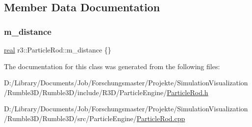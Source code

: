 \subsection{Member Data Documentation}
\mbox{\label{classr3_1_1_particle_rod_af5a502fa94afea7144eadd509a951f70}} 
\subsubsection{\texorpdfstring{m\+\_\+distance}{m\_distance}}
{\footnotesize\ttfamily \mbox{\hyperlink{namespacer3_ab2016b3e3f743fb735afce242f0dc1eb}{real}} r3\+::\+Particle\+Rod\+::m\+\_\+distance \{\}\hspace{0.3cm}{\ttfamily [protected]}}



The documentation for this class was generated from the following files\+:\begin{DoxyCompactItemize}
\item 
D\+:/\+Library/\+Documents/\+Job/\+Forschungsmaster/\+Projekte/\+Simulation\+Visualization/\+Rumble3\+D/\+Rumble3\+D/include/\+R3\+D/\+Particle\+Engine/\mbox{\hyperlink{_particle_rod_8h}{Particle\+Rod.\+h}}\item 
D\+:/\+Library/\+Documents/\+Job/\+Forschungsmaster/\+Projekte/\+Simulation\+Visualization/\+Rumble3\+D/\+Rumble3\+D/src/\+Particle\+Engine/\mbox{\hyperlink{_particle_rod_8cpp}{Particle\+Rod.\+cpp}}\end{DoxyCompactItemize}
